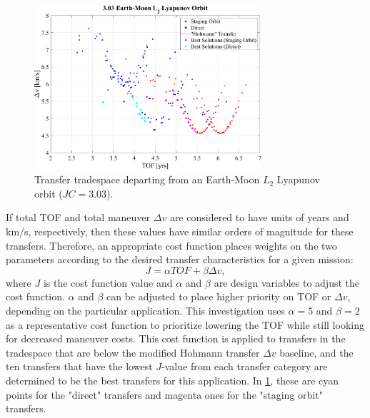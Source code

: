 \begin{figure}[ht]
    \centering
    \includegraphics[width=0.75\textwidth]{figures/TradeSpace_L2Lyapunov_3_03.pdf}
    \caption{Transfer tradespace departing from an Earth-Moon $L_{2}$ Lyapunov orbit ($JC=3.03$).}
    \label{fig:lowDeltav}
\end{figure}

If total TOF and total maneuver $\Delta v$ are considered to have units of years and km/s,
respectively, then these values have similar orders of magnitude for these transfers. Therefore, an
appropriate cost function places weights on the two parameters according to the desired transfer
characteristics for a given mission:
\begin{equation}
    J=\alpha TOF+\beta\Delta v,
    \label{eq:costfunction}
\end{equation}
where $J$ is the cost function value and $\alpha$ and $\beta$ are design variables to adjust the
cost function. $\alpha$ and $\beta$ can be adjusted to place higher priority on TOF or $\Delta v$,
depending on the particular application. This investigation uses $\alpha=5$ and $\beta=2$ as a
representative cost function to prioritize lowering the TOF while still looking for decreased
maneuver costs. This cost function is applied to transfers in the tradespace that are below the
modified Hohmann transfer $\Delta v$ baseline, and the ten transfers that have the lowest $J$-value
from each transfer category are determined to be the best transfers for this application. In
\cref{fig:lowDeltav}, these are cyan points for the "direct" transfers and magenta ones for the
"staging orbit" transfers.

